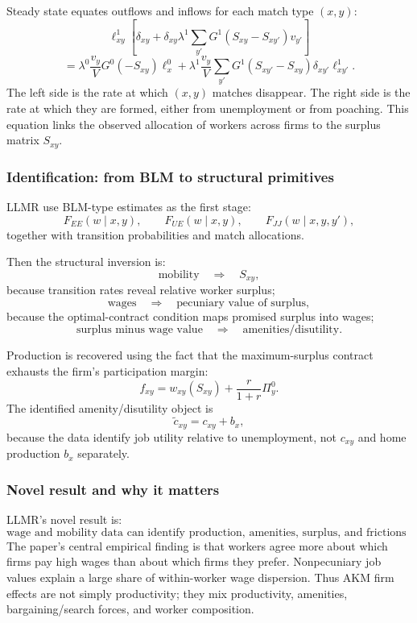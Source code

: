 \documentclass[11pt]{article}
\newcommand{\1}{\mathbf{1}}
\begin{document}
Steady state equates outflows and inflows for each match type $(x,y)$:
\[
\ell^1_{xy}
\left[
\delta_{xy}
+\delta_{xy}\lambda^1
\sum_{y'}G^1(S_{xy}-S_{xy'})v_{y'}
\right]
\]
\[
=
\lambda^0\frac{v_y}{V}G^0(-S_{xy})\ell^0_x
+
\lambda^1\frac{v_y}{V}
\sum_{y'}G^1(S_{xy'}-S_{xy})\delta_{xy'}\ell^1_{xy'}.
\]
The left side is the rate at which $(x,y)$ matches disappear. The right side is the rate at which they are formed, either from unemployment or from poaching. This equation links the observed allocation of workers across firms to the surplus matrix $S_{xy}$.

\subsubsection*{Identification: from BLM to structural primitives}

LLMR use BLM-type estimates as the first stage:
\[
F_{EE}(w\mid x,y),
\qquad
F_{UE}(w\mid x,y),
\qquad
F_{JJ}(w\mid x,y,y'),
\]
together with transition probabilities and match allocations.

Then the structural inversion is:
\[
\text{mobility}
\quad\Rightarrow\quad
S_{xy},
\]
because transition rates reveal relative worker surplus;
\[
\text{wages}
\quad\Rightarrow\quad
\text{pecuniary value of surplus},
\]
because the optimal-contract condition maps promised surplus into wages;
\[
\text{surplus minus wage value}
\quad\Rightarrow\quad
\text{amenities/disutility}.
\]

Production is recovered using the fact that the maximum-surplus contract exhausts the firm's participation margin:
\[
\boxed{
f_{xy}
=
w_{xy}(S_{xy})
+\frac{r}{1+r}\Pi^0_y.
}
\]
The identified amenity/disutility object is
\[
\tilde c_{xy}=c_{xy}+b_x,
\]
because the data identify job utility relative to unemployment, not $c_{xy}$ and home production $b_x$ separately.

\subsubsection*{Novel result and why it matters}

LLMR's novel result is:
\[
\boxed{
\text{wage and mobility data can identify production, amenities, surplus, and frictions in a rich equilibrium model.}
}
\]
The paper's central empirical finding is that workers agree more about which firms pay high wages than about which firms they prefer. Nonpecuniary job values explain a large share of within-worker wage dispersion. Thus AKM firm effects are not simply productivity; they mix productivity, amenities, bargaining/search forces, and worker composition.
\end{document}

